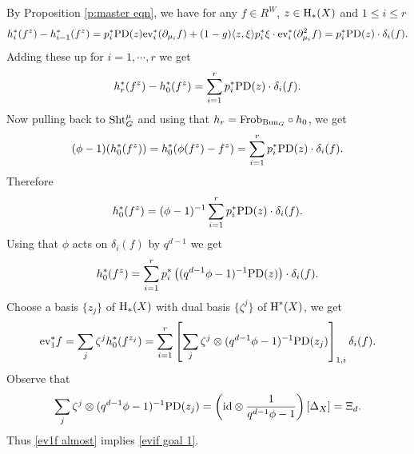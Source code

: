 \documentclass[reqno]{amsart}
\numberwithin{equation}{subsection}
\theoremstyle{definition}
\newcommand{\Bun}{\textup{Bun}}
\newcommand\ev{\textup{ev}}
\newcommand\Frob{\textup{Frob}}
\newcommand\id{\textup{id}}
\newcommand\Sht{\textup{Sht}}
\newcommand\upH{\textup{H}}
\renewcommand{\j}[1]{\langle{#1}\rangle}
\newcommand\ot{\otimes}
\renewcommand\c\circ
\newcommand{\homog}[2]{\textup{H}_{#1}({#2})}  %
\newcommand{\cohog}[2]{\textup{H}^{#1}({#2})}     %
\renewcommand\d\delta
\newcommand\D\Delta
\newcommand{\z}{\zeta}
\newcommand\PD{\textup{PD}}
\newcommand\pl{\partial}
\begin{document}
By Proposition \ref{p:master eqn}, we have for any $f\in R^W$, $z\in \upH_*(X)$ and $1\le i\le r$
\begin{equation*}
    h_i^*(f^z)-h_{i-1}^*(f^z)=p_i^*\PD(z)\ev_{i}^*(\pl_{\mu_i}f)+(1-g)\j{z,\xi}p_i^*\xi\cdot  \ev_{i}^*(\pl^2_{\mu_i}f)=p_i^*\PD(z)\cdot \d_i(f).
\end{equation*}
Adding these up for $i=1,\cdots, r$ we get
\begin{equation}\label{diff hr h0}
    h_r^*(f^z)-h_{0}^*(f^z)=\sum_{i=1}^{r}p_i^*\PD(z)\cdot \d_i(f).
\end{equation}
Now pulling back to $\Sht^\mu_G$ and using that $h_r=\Frob_{\Bun_G}\c h_0$, we get
\begin{equation}\label{h0fz pre}
    (\phi-1)(h_0^*(f^z))=h_0^{*}(\phi(f^z)-f^z)=\sum_{i=1}^{r}p_i^{*}\PD(z)\cdot \d_i(f).
\end{equation}
Therefore
\begin{equation}\label{h0fz}
    h_0^*(f^z)=(\phi-1)^{-1}\sum_{i=1}^{r}p_i^{*}\PD(z)\cdot \d_i(f).
\end{equation}
Using that $\phi$ acts on $\d_i(f)$ by $q^{d-1}$ we get
\begin{equation*}
    h_0^*(f^z)=\sum_{i=1}^{r}p_i^{*}\left((q^{d-1}\phi-1)^{-1}\PD(z)\right)\cdot \d_i(f).
\end{equation*}
Choose a basis $\{z_j\}$ of $\homog{*}{X}$ with dual basis $\{\z^j\}$ of $\cohog{*}{X}$, we get
\begin{equation}\label{ev1f almost}
\ev_1^*f=\sum_j\z^jh_0^*(f^{z_j})=\sum_{i=1}^{r}\left[\sum_{j}\z^j\ot(q^{d-1}\phi-1)^{-1}\PD(z_j)\right]_{1,i}\d_i(f).
\end{equation}
Observe that 
\begin{equation*}
    \sum_{j}\z^j\ot(q^{d-1}\phi-1)^{-1}\PD(z_j)=\left(\id\ot \frac{1}{q^{d-1}\phi-1}\right)[\D_X]=\Xi_d.
\end{equation*}
Thus \eqref{ev1f almost} implies \eqref{evif goal 1}.
\end{document}
